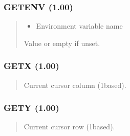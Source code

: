 \documentclass[letterpaper,10pt,english]{sphinxmanual}
\begin{document}
\subsubsection{GETENV (1.00)}
\label{\detokenize{ppl:getenv-1-00}}\begin{quote}

\sphinxAtStartPar
{}
\begin{description}
\begin{itemize}
\item {} 
\sphinxAtStartPar
{} \textendash{} Environment variable name

\end{itemize}

\sphinxAtStartPar
Value or empty if unset.

\end{description}
\end{quote}


\subsubsection{GETX (1.00)}
\label{\detokenize{ppl:getx-1-00}}\begin{quote}

\sphinxAtStartPar
{}
\begin{description}
\sphinxAtStartPar
Current cursor column (1\sphinxhyphen{}based).

\end{description}
\end{quote}


\subsubsection{GETY (1.00)}
\label{\detokenize{ppl:gety-1-00}}\begin{quote}

\sphinxAtStartPar
{}
\begin{description}
\sphinxAtStartPar
Current cursor row (1\sphinxhyphen{}based).

\end{description}
\end{quote}
\end{document}
